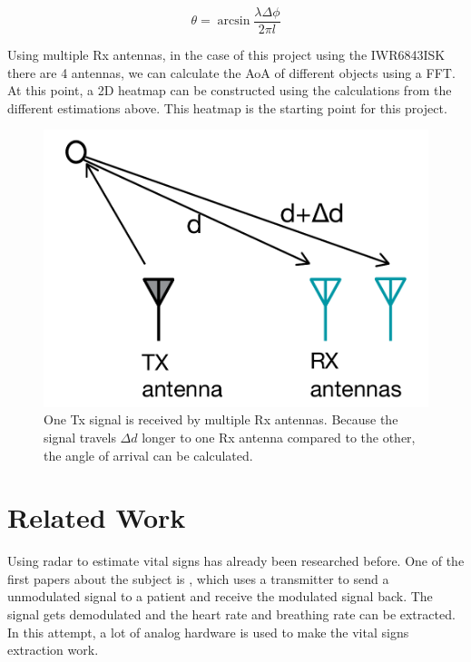 \begin{equation}
\theta = \arcsin{\frac{\lambda \Delta \phi}{2 \pi l}}
\label{eq:angle_equation_2}
\end{equation}

Using multiple Rx antennas, in the case of this project using the IWR6843ISK there are 4 antennas, we can calculate the AoA of different objects using a FFT. At this point, a 2D heatmap can be constructed using the calculations from the different estimations above. This heatmap is the starting point for this project.

\begin{figure}[t]
\centering
\includegraphics[width=.5\textwidth]{figures/background/angle_estimation.png}
\caption{One Tx signal is received by multiple Rx antennas. Because the signal travels $\Delta d$ longer to one Rx antenna compared to the other, the angle of arrival can be calculated.}
\label{fig:angle_estimation}
\end{figure}

\section{Related Work}
\label{sec:related_work}
Using radar to estimate vital signs has already been researched before. One of the first papers about the subject is \cite{li2009radar}, which uses a transmitter to send a unmodulated signal to a patient and receive the modulated signal back. The signal gets demodulated and the heart rate and breathing rate can be extracted. In this attempt, a lot of analog hardware is used to make the vital signs extraction work. 

